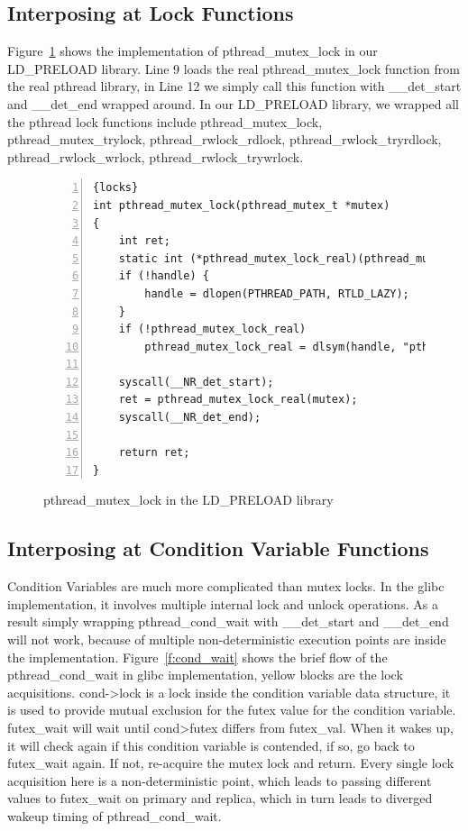 \subsection{Interposing at Lock Functions}

Figure~\ref{f:orverridelocks} shows the implementation of pthread\_mutex\_lock in our LD\_PRELOAD library. Line 9 loads the real pthread\_mutex\_lock function from the real pthread library, in Line 12 we simply call this function with \_\_det\_start and \_\_det\_end wrapped around. In our LD\_PRELOAD library, we wrapped all the pthread lock functions include pthread\_mutex\_lock, pthread\_mutex\_trylock, pthread\_rwlock\_rdlock, pthread\_rwlock\_tryrdlock, pthread\_rwlock\_wrlock, pthread\_rwlock\_trywrlock.

\begin{figure}
\begin{lstlisting}[numbers=left, frame=single, basicstyle=\small, breaklines]{locks}
int pthread_mutex_lock(pthread_mutex_t *mutex)
{
    int ret;
    static int (*pthread_mutex_lock_real)(pthread_mutex_t *mutex) = NULL;    
    if (!handle) {
        handle = dlopen(PTHREAD_PATH, RTLD_LAZY);
    }
    if (!pthread_mutex_lock_real)
        pthread_mutex_lock_real = dlsym(handle, "pthread_mutex_lock");

    syscall(__NR_det_start);
    ret = pthread_mutex_lock_real(mutex);
    syscall(__NR_det_end);

    return ret;
}
\end{lstlisting}
\caption{pthread\_mutex\_lock in the LD\_PRELOAD library}
\label{f:orverridelocks}
\end{figure}

\subsection{Interposing at Condition Variable Functions}

Condition Variables are much more complicated than mutex locks. In the glibc implementation, it involves multiple internal lock and unlock operations. As a result simply wrapping pthread\_cond\_wait with \_\_det\_start and \_\_det\_end will not work, because of multiple non-deterministic execution points are inside the implementation. Figure~\ref{f:cond_wait} shows the brief flow of the pthread\_cond\_wait in glibc implementation, yellow blocks are the lock acquisitions. cond->lock is a lock inside the condition variable  data structure, it is used to provide mutual exclusion for the futex value for the condition variable. futex\_wait will wait until cond\->futex differs from futex\_val. When it wakes up, it will check again if this condition variable is contended, if so, go back to futex\_wait again. If not, re-acquire the mutex lock and return. Every single lock acquisition here is a non-deterministic point, which leads to passing different values to futex\_wait on primary and replica, which in turn leads to diverged wakeup timing of pthread\_cond\_wait.

